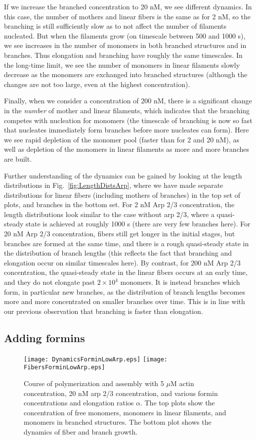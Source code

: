 \documentclass[11pt]{article}
\begin{document}
If we increase the branched concentration to 20 nM, we see different dynamics. In this case, the number of mothers and linear fibers is the same as for 2 nM, so the branching is still sufficiently slow as to not affect the number of filaments nucleated. But when the filaments grow (on timescale between 500 and 1000 s), we see increases in the number of monomers in both branched structures and in branches. Thus elongation and branching have roughly the same timescales. In the long-time limit, we see the number of monomers in linear filaments slowly decrease as the monomers are exchanged into branched structures (although the changes are not too large, even at the highest concentration).

Finally, when we consider a concentration of 200 nM, there is a significant change in the \emph{number} of mother and linear filaments, which indicates that the branching competes with nucleation for monomers (the timescale of branching is now so fast that nucleates immediately form branches before more nucleates can form). Here we see rapid depletion of the monomer pool (faster than for 2 and 20 nM), as well as depletion of the monomers in linear filaments as more and more branches are built. 

Further understanding of the dynamics can be gained by looking at the length distributions in Fig.\ \ref{fig:LengthDistsArp}, where we have made separate distributions for linear fibers (including mothers of branches) in the top set of plots, and branches in the bottom set. For 2 nM Arp 2/3 concentration, the length distributions look similar to the case without arp 2/3, where a quasi-steady state is achieved at roughly 1000 s (there are very few branches here). For 20 nM Arp 2/3 concentration, fibers still get longer in the initial stages, but branches are formed at the same time, and there is a rough quasi-steady state in the distribution of branch lengths (this reflects the fact that branching and elongation occur on similar timescales here). By contrast, for 200 nM Arp 2/3 concentration, the quasi-steady state in the linear fibers occurs at an early time, and they do not elongate past $2 \times 10^4$ monomers. It is instead branches which form, in particular new branches, as the distribution of branch lengths becomes more and more concentrated on smaller branches over time. This is in line with our previous observation that branching is faster than elongation. 


\subsection{Adding formins}
\begin{figure}
\centering
\texttt{[image: DynamicsForminLowArp.eps]}
\texttt{[image: FibersForminLowArp.eps]}
\caption{\label{fig:ForminLowArp}Course of polymerization and assembly with 5 $\mu$M actin concentration, 20 nM arp 2/3 concentration, and various formin concentrations and elongation ratios $\alpha$. The top plots show the concentration of free monomers, monomers in linear filaments, and monomers in branched structures. The bottom plot shows the dynamics of fiber and branch growth. }
\end{figure}
\end{document}
